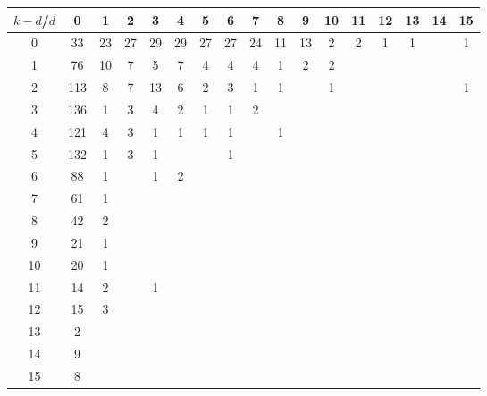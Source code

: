 \documentclass{article}
\begin{document}
\begin{table}[h]\footnotesize
{\centering
\begin{tabular}{|c|c|
c|c|c|c|c|c|c|c|c|c|c|c|c|c|c|}
  \hline
  $k-d$/$d$ 
 & 0 & 1 & 2 & 3 & 4 & 5 & 6 & 7 & 8 & 9 & 10 & 11 & 12 & 13 & 14 & 15\\

  \hline
  \hline

0  & 33 & 23 & 27 & 29 & 29 & 27 & 27 & 24 & 11 & 13 & 2 & 2 & 1 & 1 &  & 1\\

1  & 76 & 10 & 7 & 5 & 7 & 4 & 4 & 4 & 1 & 2 & 2 &  &  &  &  & \\

2  & 113 & 8 & 7 & 13 & 6 & 2 & 3 & 1 & 1 &  & 1 &  &  &  &  & 1\\

3  & 136 & 1 & 3 & 4 & 2 & 1 & 1 & 2 &  &  &  &  &  &  &  & \\

4  & 121 & 4 & 3 & 1 & 1 & 1 & 1 &  & 1 &  &  &  &  &  &  & \\

5  & 132 & 1 & 3 & 1 &  &  & 1 &  &  &  &  &  &  &  &  & \\

6  & 88 & 1 &  & 1 & 2 &  &  &  &  &  &  &  &  &  &  & \\

7  & 61 & 1 &  &  &  &  &  &  &  &  &  &  &  &  &  & \\

8  & 42 & 2 &  &  &  &  &  &  &  &  &  &  &  &  &  & \\

9  & 21 & 1 &  &  &  &  &  &  &  &  &  &  &  &  &  & \\

10  & 20 & 1 &  &  &  &  &  &  &  &  &  &  &  &  &  & \\

11  & 14 & 2 &  & 1 &  &  &  &  &  &  &  &  &  &  &  & \\

12  & 15 & 3 &  &  &  &  &  &  &  &  &  &  &  &  &  & \\

13  & 2 &  &  &  &  &  &  &  &  &  &  &  &  &  &  & \\

14  & 9 &  &  &  &  &  &  &  &  &  &  &  &  &  &  & \\

15  & 8 &  &  &  &  &  &  &  &  &  &  &  &  &  &  & \\


\end{tabular}}
\end{table}
\end{document}
